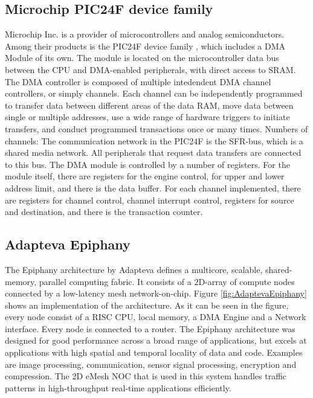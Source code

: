 \subsection{Microchip PIC24F device family}
Microchip Inc. is a provider of microcontrollers and analog semiconductors.
Among their products is the PIC24F device family \cite{microchip1}, which includes a DMA Module of its own\cite{microchip54}.
The module is located on the microcontroller data bus between the CPU and DMA-enabled peripherals, with direct access to SRAM.
The DMA controller is composed of multiple intedendent DMA channel controllers, or simply channels.
Each channel can be independently programmed to transfer data between different areas of the data RAM, move data between single or multiple addresses, use a wide range of hardware triggers to initiate transfers, and conduct programmed transactions once or many times. 
Numbers of channels: 
The communication network in the PIC24F is the SFR-bus, which is a shared media network.
All peripherals that request data transfers are connected to this bus.
The DMA module is controlled by a number of registers.
For the module itself, there are registers for the engine control, for upper and lower address limit, and there is the data buffer.
For each channel implemented, there are registers for channel control, channel interrupt control, registers for source and destination, and there is the transaction counter. 

\subsection{Adapteva Epiphany}
The Epiphany architecture by Adapteva \cite{epiphany} defines a multicore, scalable, shared-memory, parallel computing fabric.
It consists of a 2D-array of compute nodes connected by a low-latency mesh network-on-chip.
Figure \ref{fig:AdaptevaEpiphany} shows an implementation of the architecture.
As it can be seen in the figure, every node consist of a RISC CPU, local memory, a DMA Engine and a Network interface.
Every node is connected to a router.
The Epiphany architecture was designed for good performance across a broad range of applications, but excels at applications with high spatial and temporal locality of data and code.
Examples are image processing, communication, sensor signal processing, encryption and compression.
The 2D eMesh NOC that is used in this system handles traffic patterns in high-throughput real-time applications efficiently.

